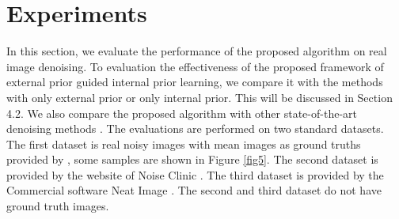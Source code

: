 \documentclass[10pt,twocolumn,letterpaper]{article}
\begin{document}
\section{Experiments}

In this section, we evaluate the performance of the proposed algorithm on real image denoising. To evaluation the effectiveness of the proposed framework of external prior guided internal prior learning, we compare it with the methods with only external prior or only internal prior. This will be discussed in Section 4.2. We also compare the proposed algorithm with other state-of-the-art denoising methods \cite{bm3d,cbm3d,mlp,wnnm,csf,chen2015learning,crosschannel2016,noiseclinic,neatimage}. The evaluations are performed on two standard datasets. The first dataset is real noisy images with mean images as ground truths provided by \cite{crosschannel2016}, some samples are shown in Figure \ref{fig5}. The second dataset is provided by the website of Noise Clinic \cite{noiseclinic}. The third dataset is provided by the Commercial software Neat Image \cite{neatimage}. The second and third dataset do not have ground truth images.
\end{document}
